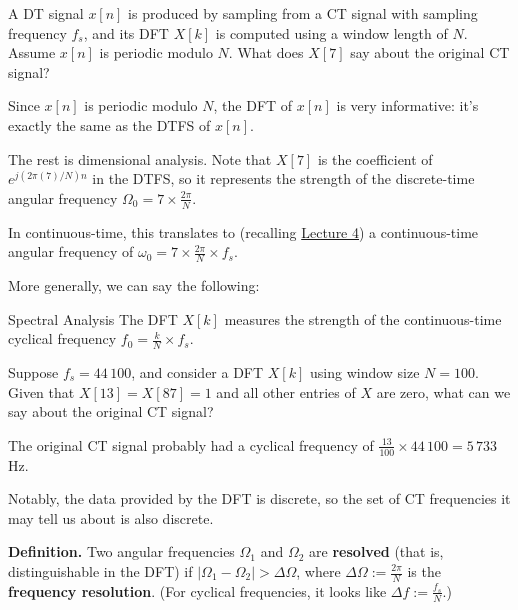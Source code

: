 \begin{problem}
    A DT signal $x[n]$ is produced by sampling from a CT signal
    with sampling frequency $f_s$,
    and its DFT $X[k]$ is computed using a window length of $N$.
    Assume $x[n]$ is periodic modulo $N$.
    What does $X[7]$ say about the original CT signal?
\end{problem}

\begin{solution}
    Since $x[n]$ is periodic modulo $N$,
    the DFT of $x[n]$ is very informative:
    it's exactly the same as the DTFS of $x[n]$.

    The rest is dimensional analysis.
    Note that $X[7]$ is the coefficient of $e^{j(2\pi(7)/N)n}$
    in the DTFS, so it represents the strength of the
    discrete-time angular frequency $\Omega_0 = 7 \times \frac{2\pi}{N}$.
    
    In continuous-time, this translates to
    (recalling \href{/6.300/lectures/4/#recitation-dimensional-analysis}{Lecture 4})
    a continuous-time angular frequency of
    $\omega_0 = 7 \times \frac{2\pi}{N} \times f_s$.
\end{solution}

More generally, we can say the following:

\begin{theorem}{Spectral Analysis}
    The DFT $X[k]$ measures the strength of the
    continuous-time cyclical frequency $f_0 = \frac{k}{N} \times f_s$.
\end{theorem}

\begin{problem}
    Suppose $f_s = 44 \, 100$, and consider a DFT $X[k]$ using window size $N = 100$.
    Given that $X[13] = X[87] = 1$ and all other entries of $X$ are zero,
    what can we say about the original CT signal?
\end{problem}

\begin{solution}
    The original CT signal probably had a cyclical frequency
    of $\frac{13}{100} \times 44 \, 100 = 5 \, 733$ Hz.
\end{solution}

Notably, the data provided by the DFT is discrete,
so the set of CT frequencies it may tell us about is also discrete.

\textbf{Definition.} Two angular frequencies $\Omega_1$ and $\Omega_2$
are \textbf{resolved} (that is, distinguishable in the DFT)
if $|\Omega_1 - \Omega_2| > \Delta\Omega$,
where $\Delta\Omega := \frac{2\pi}{N}$ is the
\textbf{frequency resolution}.
(For cyclical frequencies, it looks like $\Delta f := \frac{f_s}{N}$.)

